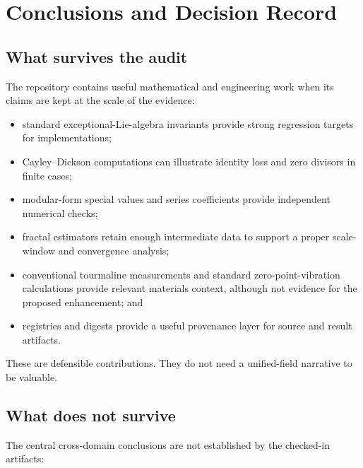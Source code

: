 \chapter{Conclusions and Decision Record}
\label{ch:conclusions}

\section{What survives the audit}

The repository contains useful mathematical and engineering work when its
claims are kept at the scale of the evidence:

\begin{itemize}
  \item standard exceptional-Lie-algebra invariants provide strong regression
    targets for implementations;
  \item Cayley--Dickson computations can illustrate identity loss and zero
    divisors in finite cases;
  \item modular-form special values and series coefficients provide independent
    numerical checks;
  \item fractal estimators retain enough intermediate data to support a proper
    scale-window and convergence analysis;
  \item conventional tourmaline measurements and standard zero-point-vibration
    calculations provide relevant materials context, although not evidence for
    the proposed enhancement; and
  \item registries and digests provide a useful provenance layer for source and
    result artifacts.
\end{itemize}

These are defensible contributions. They do not need a unified-field narrative
to be valuable.

\section{What does not survive}

The central cross-domain conclusions are not established by the checked-in
artifacts:

